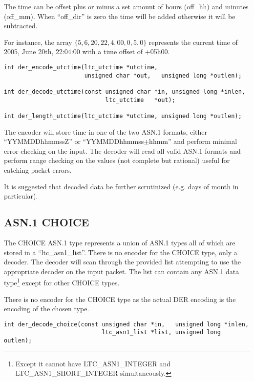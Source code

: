 \documentclass[a4paper]{book}
\begin{document}
The time can be offset plus or minus a set amount of hours (off\_hh) and minutes (off\_mm).  When ``off\_dir'' is zero the time will be added otherwise it 
will be subtracted.  

For instance, the array $\lbrace 5, 6, 20, 22, 4, 00, 0, 5, 0 \rbrace$ represents the current time of 2005, June 20th, 22:04:00 with a time offset of +05h00.  

\begin{verbatim}
int der_encode_utctime(ltc_utctime *utctime, 
                       unsigned char *out,   unsigned long *outlen);

int der_decode_utctime(const unsigned char *in, unsigned long *inlen,
                             ltc_utctime   *out);

int der_length_utctime(ltc_utctime *utctime, unsigned long *outlen);
\end{verbatim}

The encoder will store time in one of the two ASN.1 formats, either ``YYMMDDhhmmssZ'' or ``YYMMDDhhmmss$\pm$hhmm'' and perform minimal error checking on the 
input.  The decoder will read all valid ASN.1 formats and perform range checking on the values (not complete but rational) useful for catching packet errors.

It is suggested that decoded data be further scrutinized (e.g. days of month in particular).

\subsection{ASN.1 CHOICE}

The CHOICE ASN.1 type represents a union of ASN.1 types all of which are stored in a ``ltc\_asn1\_list''.  There is no encoder for the CHOICE type, only a 
decoder.  The decoder will scan through the provided list attempting to use the appropriate decoder on the input packet.  The list can contain any ASN.1 data
type\footnote{Except it cannot have LTC\_ASN1\_INTEGER and LTC\_ASN1\_SHORT\_INTEGER simultaneously.} except for other CHOICE types.  

There is no encoder for the CHOICE type as the actual DER encoding is the encoding of the chosen type.  

\begin{verbatim}
int der_decode_choice(const unsigned char *in,   unsigned long *inlen,
                            ltc_asn1_list *list, unsigned long  outlen);
\end{verbatim}
\end{document}

